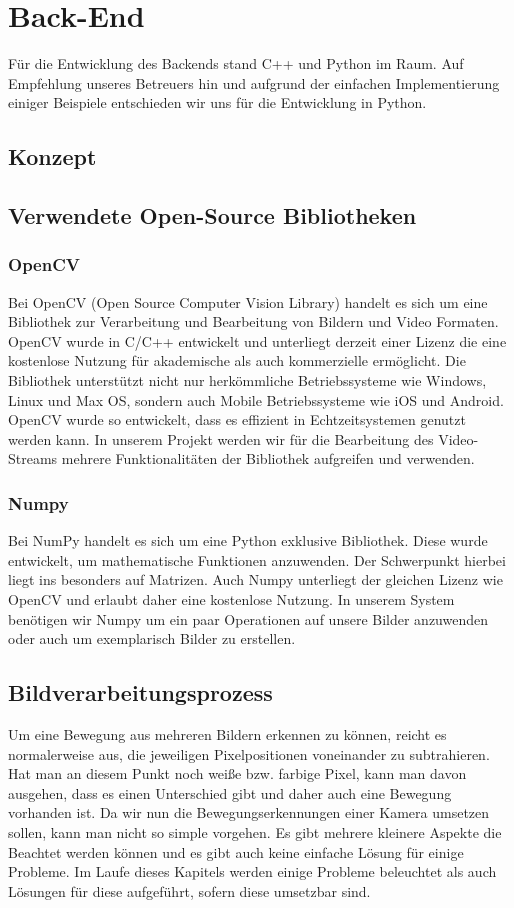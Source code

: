 \chapter{Back-End}
Für die Entwicklung des Backends stand C++ und Python im Raum. Auf Empfehlung unseres Betreuers hin und aufgrund der einfachen Implementierung einiger Beispiele entschieden wir uns
für die Entwicklung in Python.
\section{Konzept}
\section{Verwendete Open-Source Bibliotheken}
\subsection{OpenCV}
Bei OpenCV (Open Source Computer Vision Library) handelt es sich um eine Bibliothek zur Verarbeitung und Bearbeitung von Bildern und Video Formaten.  OpenCV wurde in C/C++ entwickelt und unterliegt derzeit einer Lizenz die eine kostenlose Nutzung für akademische als auch kommerzielle ermöglicht. Die Bibliothek unterstützt nicht nur herkömmliche Betriebssysteme wie Windows, Linux und Max OS, sondern auch Mobile Betriebssysteme wie iOS und Android. OpenCV wurde so entwickelt, dass es effizient in Echtzeitsystemen genutzt werden kann. In unserem Projekt werden wir für die Bearbeitung des Video-Streams mehrere Funktionalitäten der Bibliothek aufgreifen und verwenden.
\subsection{Numpy}
Bei NumPy handelt es sich um eine Python exklusive Bibliothek. Diese wurde entwickelt, um mathematische Funktionen anzuwenden. Der Schwerpunkt hierbei liegt ins besonders auf Matrizen. Auch Numpy unterliegt der gleichen Lizenz wie OpenCV und erlaubt daher eine kostenlose Nutzung. In unserem System benötigen wir Numpy um ein paar Operationen auf unsere Bilder anzuwenden oder auch um exemplarisch Bilder zu erstellen.
\section{Bildverarbeitungsprozess}
Um eine Bewegung aus mehreren Bildern erkennen zu können, reicht es normalerweise aus, die jeweiligen Pixelpositionen voneinander zu subtrahieren. Hat man an diesem Punkt noch weiße bzw. farbige Pixel, kann man davon ausgehen, dass es einen Unterschied gibt und daher auch eine Bewegung vorhanden ist. Da wir nun die Bewegungserkennungen einer Kamera umsetzen sollen, kann man nicht so simple vorgehen. Es gibt mehrere kleinere Aspekte die Beachtet werden können und es gibt auch keine einfache Lösung für einige Probleme. Im Laufe dieses Kapitels werden einige Probleme beleuchtet als auch Lösungen für diese aufgeführt, sofern diese umsetzbar sind.

